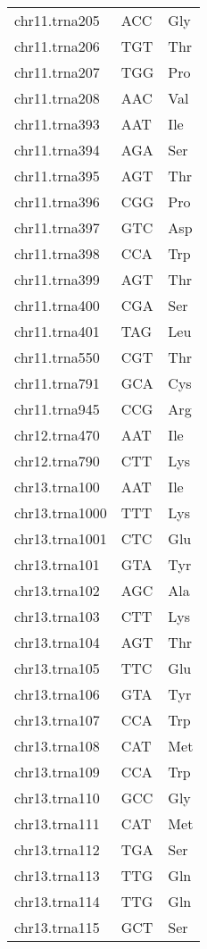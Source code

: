 \begin{longtable}{@{}l>{\collectcell\anticodon}l<{\endcollectcell}l@{}}
    chr11.trna205 & ACC & Gly \\
    chr11.trna206 & TGT & Thr \\
    chr11.trna207 & TGG & Pro \\
    chr11.trna208 & AAC & Val \\
    chr11.trna393 & AAT & Ile \\
    chr11.trna394 & AGA & Ser \\
    chr11.trna395 & AGT & Thr \\
    chr11.trna396 & CGG & Pro \\
    chr11.trna397 & GTC & Asp \\
    chr11.trna398 & CCA & Trp \\
    chr11.trna399 & AGT & Thr \\
    chr11.trna400 & CGA & Ser \\
    chr11.trna401 & TAG & Leu \\
    chr11.trna550 & CGT & Thr \\
    chr11.trna791 & GCA & Cys \\
    chr11.trna945 & CCG & Arg \\
    chr12.trna470 & AAT & Ile \\
    chr12.trna790 & CTT & Lys \\
    chr13.trna100 & AAT & Ile \\
    chr13.trna1000 & TTT & Lys \\
    chr13.trna1001 & CTC & Glu \\
    chr13.trna101 & GTA & Tyr \\
    chr13.trna102 & AGC & Ala \\
    chr13.trna103 & CTT & Lys \\
    chr13.trna104 & AGT & Thr \\
    chr13.trna105 & TTC & Glu \\
    chr13.trna106 & GTA & Tyr \\
    chr13.trna107 & CCA & Trp \\
    chr13.trna108 & CAT & Met \\
    chr13.trna109 & CCA & Trp \\
    chr13.trna110 & GCC & Gly \\
    chr13.trna111 & CAT & Met \\
    chr13.trna112 & TGA & Ser \\
    chr13.trna113 & TTG & Gln \\
    chr13.trna114 & TTG & Gln \\
    chr13.trna115 & GCT & Ser \\

\end{longtable}
